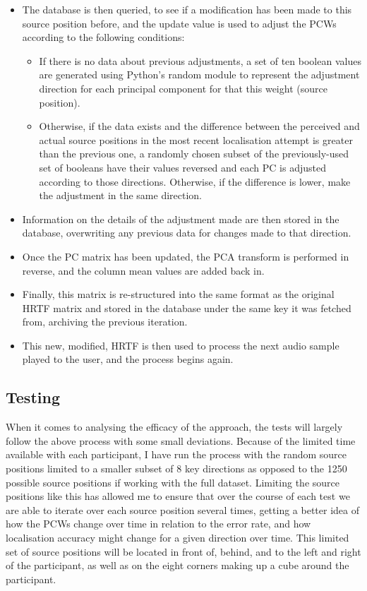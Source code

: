 \begin{itemize}
\item The database is then queried, to see if a modification has been made to this source position before, and the update value is used to adjust the PCWs according to the following conditions:
\begin{itemize}
\item If there is no data about previous adjustments, a set of ten boolean values are generated using Python's random module\citep{python random} to represent the adjustment direction for each principal component for that this weight (source position). 
\item Otherwise, if the data exists and the difference between the perceived and actual source positions in the most recent localisation attempt is greater than the previous one, a randomly chosen subset of the previously-used set of booleans have their values reversed and each PC is adjusted according to those directions. Otherwise, if the difference is lower, make the adjustment in the same direction. 
\end{itemize}
\item Information on the details of the adjustment made are then stored in the database, overwriting any previous data for changes made to that direction.
\item Once the PC matrix has been updated, the PCA transform is performed in reverse, and the column mean values are added back in.
\item Finally, this matrix is re-structured into the same format as the original HRTF matrix and stored in the database under the same key it was fetched from, archiving the previous iteration. 
\item This new, modified, HRTF is then used to process the next audio sample played to the user, and the process begins again. 
\end{itemize}

\subsection{Testing}
When it comes to analysing the efficacy of the approach, the tests will largely follow the above process with some small deviations. Because of the limited time available with each participant, I have run the process with the random source positions limited to a smaller subset of 8 key directions as opposed to the 1250 possible source positions if working with the full dataset. Limiting the source positions like this has allowed me to ensure that over the course of each test we are able to iterate over each source position several times, getting a better idea of how the PCWs change over time in relation to the error rate, and how localisation accuracy might change for a given direction over time. This limited set of source positions will be located in front of, behind, and to the left and right of the participant, as well as on the eight corners making up a cube around the participant.

